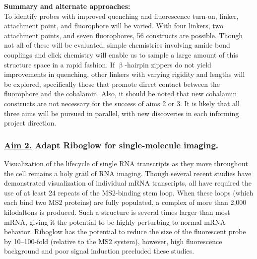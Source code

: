 \textbf{Summary and alternate approaches:}\\
To identify probes with improved quenching and fluorescence turn-on, linker, attachment point, and fluorophore will be varied. With four linkers, two attachment points, and seven fluorophores, 56 constructs are possible. Though not all of these will be evaluated, simple chemistries involving amide bond couplings and click chemistry will enable us to sample a large amount of this structure space in a rapid fashion. If $\upbeta$-hairpin zippers do not yield improvements in quenching, other linkers with varying rigidity and lengths will be explored\cite{LeeDesignSynthesisCharacterization2009}, specifically those that promote direct contact between the fluorophore and the cobalamin. Also, it should be noted that new cobalamin constructs are not necessary for the success of aims 2 or 3. It is likely that all three aims will be pursued in parallel, with new discoveries in each informing project direction.

\subsubsection*{\underline{Aim 2.} Adapt Riboglow for single-molecule imaging.}
Visualization of the lifecycle of single RNA transcripts as they move throughout the cell remains a holy grail of RNA imaging.\cite{LiCentraldogmasinglemolecule2011} Though several recent studies have demonstrated visualization of individual mRNA transcripts, all have required the use of at least 24 repeats of the MS2-binding stem loop\cite{KatzMappingtranslationhotspots2016,FuscoSinglemRNAMolecules2003,YamagishiSinglemoleculeimagingvactin2009,HalsteadRNAbiosensorimaging2015}.
When these loops (which each bind two MS2 proteins) are fully populated, a complex of more than 2,000 kilodaltons is produced.
Such a structure is several times larger than most mRNA, giving it the potential to be highly perturbing to normal mRNA behavior.
Riboglow has the potential to reduce the size of the fluorescent probe by 10--100-fold (relative to the MS2 system), however, high fluorescence background and poor signal induction precluded these studies\cite{BraselmannDevelopmentriboswitchbasedplatform2017}.


